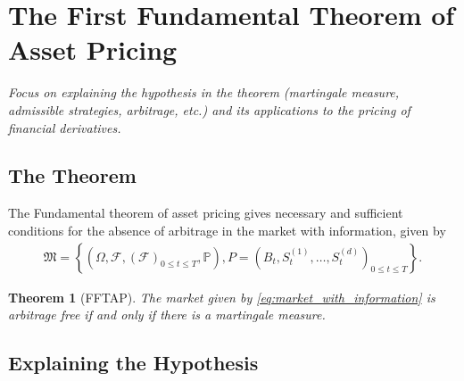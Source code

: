 \documentclass{article}
\newtheorem{theorem}{Theorem}[section]
\theoremstyle{definition}
\numberwithin{equation}{section}
\begin{document}
\newpage

\section{The First Fundamental Theorem of Asset Pricing}
\textit{Focus on explaining the hypothesis in the theorem (martingale measure, admissible strategies, arbitrage, etc.) and its applications to the pricing of financial derivatives.}

\subsection{The Theorem}
The Fundamental theorem of asset pricing gives necessary and sufficient conditions for the absence of arbitrage in the market with information, given by
\begin{align}\label{eq:market_with_information}
    \mathfrak{M} =
    \left\{
        \left(
            \Omega, 
            \mathscr{F}, 
            \left(
                \mathscr{F}
            \right)_{0 \leq t \leq T},
            \mathbb{P}
        \right),
        P =
        \left(
            B_t,
            S_t^{(1)},
            \ldots,
            S_t^{(d)}
        \right)_{0 \leq t \leq T}
    \right\}.
\end{align}

\begin{theorem}[FFTAP]\label{th:fftap}
    The market given by \eqref{eq:market_with_information} is arbitrage free if and only if there is a martingale measure. 
\end{theorem}

\subsection{Explaining the Hypothesis}
\end{document}

